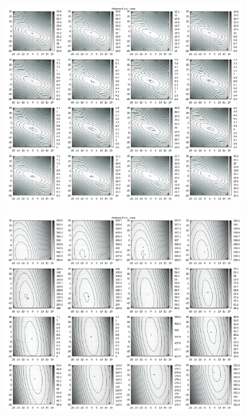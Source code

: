 \begin{appendix}
\begin{figure}[!ht]
\begin{subfigure}[t]{0.3\textwidth}
	\end{subfigure}
\\
	\centering
	\begin{subfigure}[t]{0.3\textwidth}
	     \centering
	     \includegraphics[width=\textwidth]{img/fitness/xy/a6.png}
	\end{subfigure}
	\begin{subfigure}[t]{0.3\textwidth}
		\centering
	     \includegraphics[width=\textwidth]{img/fitness/xz/a6.png}

\end{subfigure}
\end{figure}
\end{appendix}
